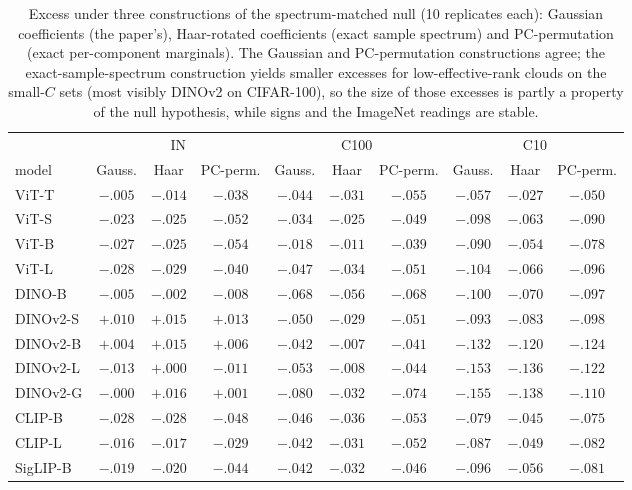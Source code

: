 \begin{table}[H]
\centering
\scriptsize
\setlength{\tabcolsep}{3pt}
\begin{tabular}{l|ccc|ccc|ccc}
\toprule
 & \multicolumn{3}{c}{IN} & \multicolumn{3}{c}{C100} & \multicolumn{3}{c}{C10} \\
model & Gauss. & Haar & PC-perm. & Gauss. & Haar & PC-perm. & Gauss. & Haar & PC-perm. \\
\midrule
ViT-T & $-.005$ & $-.014$ & $-.038$ & $-.044$ & $-.031$ & $-.055$ & $-.057$ & $-.027$ & $-.050$ \\
ViT-S & $-.023$ & $-.025$ & $-.052$ & $-.034$ & $-.025$ & $-.049$ & $-.098$ & $-.063$ & $-.090$ \\
ViT-B & $-.027$ & $-.025$ & $-.054$ & $-.018$ & $-.011$ & $-.039$ & $-.090$ & $-.054$ & $-.078$ \\
ViT-L & $-.028$ & $-.029$ & $-.040$ & $-.047$ & $-.034$ & $-.051$ & $-.104$ & $-.066$ & $-.096$ \\
\midrule
DINO-B & $-.005$ & $-.002$ & $-.008$ & $-.068$ & $-.056$ & $-.068$ & $-.100$ & $-.070$ & $-.097$ \\
DINOv2-S & $+.010$ & $+.015$ & $+.013$ & $-.050$ & $-.029$ & $-.051$ & $-.093$ & $-.083$ & $-.098$ \\
DINOv2-B & $+.004$ & $+.015$ & $+.006$ & $-.042$ & $-.007$ & $-.041$ & $-.132$ & $-.120$ & $-.124$ \\
DINOv2-L & $-.013$ & $+.000$ & $-.011$ & $-.053$ & $-.008$ & $-.044$ & $-.153$ & $-.136$ & $-.122$ \\
DINOv2-G & $-.000$ & $+.016$ & $+.001$ & $-.080$ & $-.032$ & $-.074$ & $-.155$ & $-.138$ & $-.110$ \\
\midrule
CLIP-B & $-.028$ & $-.028$ & $-.048$ & $-.046$ & $-.036$ & $-.053$ & $-.079$ & $-.045$ & $-.075$ \\
CLIP-L & $-.016$ & $-.017$ & $-.029$ & $-.042$ & $-.031$ & $-.052$ & $-.087$ & $-.049$ & $-.082$ \\
SigLIP-B & $-.019$ & $-.020$ & $-.044$ & $-.042$ & $-.032$ & $-.046$ & $-.096$ & $-.056$ & $-.081$ \\
\bottomrule
\end{tabular}
\caption{Excess under three constructions of the spectrum-matched null (10 replicates each): Gaussian coefficients (the paper's), Haar-rotated coefficients (exact sample spectrum) and PC-permutation (exact per-component marginals). The Gaussian and PC-permutation constructions agree; the exact-sample-spectrum construction yields smaller excesses for low-effective-rank clouds on the small-$C$ sets (most visibly DINOv2 on CIFAR-100), so the size of those excesses is partly a property of the null hypothesis, while signs and the ImageNet readings are stable.}
\label{tab:b27-nullvariants}
\end{table}
